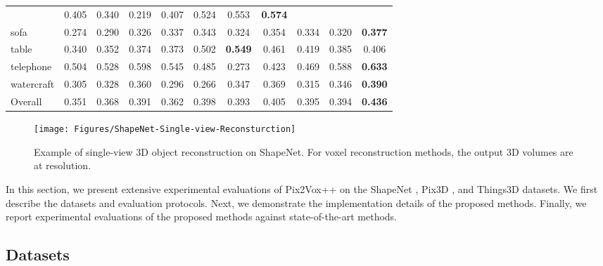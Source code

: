 \documentclass[twocolumn]{svjour3}
\begin{document}
\begin{table*}[!t]
{\begin{tabular}{lcccccccccc}
                   & 0.405      & 0.340      & 0.219
                   & 0.407      & 0.524
                   & 0.553      & \bf{0.574} \\
      sofa         & 0.274      & 0.290      & 0.326
                   & 0.337      & 0.343      & 0.324
                   & 0.354      & 0.334
                   & 0.320      & \bf{0.377} \\
      table        & 0.340      & 0.352      & 0.374
                   & 0.373      & 0.502      & \bf{0.549}
                   & 0.461      & 0.419
                   & 0.385      & 0.406 \\
      telephone    & 0.504      & 0.528      & 0.598
                   & 0.545      & 0.485      & 0.273
                   & 0.423      & 0.469
                   & 0.588      & \bf{0.633} \\
      watercraft   & 0.305      & 0.328      & 0.360
                   & 0.296      & 0.266      & 0.347
                   & 0.369      & 0.315
                   & 0.346      & \bf{0.390} \\
      \midrule
      Overall      & 0.351      & 0.368      & 0.391
                   & 0.362      & 0.398      & 0.393
                   & 0.405      & 0.395
                   & 0.394      & \bf{0.436} \\
      \bottomrule
    \end{tabular}
  }
  \label{tab:shapenet-voxel-reconstruction-fscore}
\end{table*}

\begin{figure*}
  \centering
  \resizebox{\linewidth}{!} {
    \texttt{[image: Figures/ShapeNet-Single-view-Reconsturction]}
  }
  \caption{Example of single-view 3D object reconstruction on ShapeNet. For voxel reconstruction methods, the output 3D volumes are at  resolution.}
  \label{fig:shapenet-single-view-reconstruction}
  \vspace{1 mm}
\end{figure*}

In this section, we present extensive experimental evaluations of Pix2Vox++ on the ShapeNet \citep{DBLP:conf/cvpr/WuSKYZTX15}, Pix3D \citep{DBLP:conf/cvpr/Sun0ZZZXTF18}, and Things3D datasets.
We first describe the datasets and evaluation protocols.
Next, we demonstrate the implementation details of the proposed methods.
Finally, we report experimental evaluations of the proposed methods against state-of-the-art methods.

\subsection{Datasets}
\end{document}
